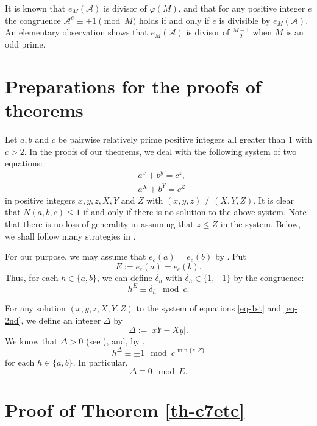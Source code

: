 \documentclass[11pt]{amsart}
\numberwithin{equation}{section}
\begin{document}
It is known that $e_M(\mathcal A)$ is divisor of $\varphi(M)$, and that for any positive integer $e$ the congruence $\mathcal A^e \equiv \pm 1 \pmod{M}$ holds if and only if $e$ is divisible by $e_M(\mathcal A)$.
An elementary observation shows that $e_M(\mathcal A)$ is divisor of $\frac{M-1}{2}$ when $M$ is an odd prime.

\section{Preparations for the proofs of theorems} \label{sec-4}

Let $a,b$ and $c$ be pairwise relatively prime positive integers all greater than 1 with $c>2$.
In the proofs of our theorems, we deal with the following system of two equations:
\begin{eqnarray}
&a^x+b^y=c^z, \label{eq-1st}\\
&a^X+b^Y=c^Z \label{eq-2nd}
\end{eqnarray}
in positive integers $x,y,z,X,Y$ and $Z$ with $(x,y,z) \ne (X,Y,Z)$.
It is clear that $N(a,b,c) \le 1$ if and only if there is no solution to the above system. 
Note that there is no loss of generality in assuming that $z \le Z$ in the system.
Below, we shall follow many strategies in \cite{MP3}.

For our purpose, we may assume that $e_{c}(a)=e_{c}(b)$ by \cite[Lemma 3.1]{MP3}. 
Put 
\[
E:=e_{c}(a)=e_{c}(b).
\]
Thus, for each $h \in \{a,b\}$, we can define $\delta_h$ with $\delta_h \in \{1,-1\}$ by the congruence:
\[
h^E \equiv \delta_h \mod{c}.
\]

For any solution $(x,y,z,X,Y,Z)$ to the system of equations \eqref{eq-1st} and \eqref{eq-2nd}, we define an integer $\Delta$ by
\[
\Delta:=|xY-Xy|.
\]
We know that $\Delta>0$ (see \cite{MP3}), and, by \cite[Lemma 4.4\,(i)]{MP3},   
\begin{equation} \label{cong-hdelta1modcz}
h^\Delta \equiv \pm1 \mod{c^{\,\min\{z,Z\}}}
\end{equation}
for each $h \in \{a,b\}$.
In particular, %
\begin{equation} \label{cong-Delta0modE}
\Delta \equiv 0 \mod{E}.
\end{equation}

\section{Proof of Theorem \ref{th-c7etc}}\label{sec-5}
\end{document}
